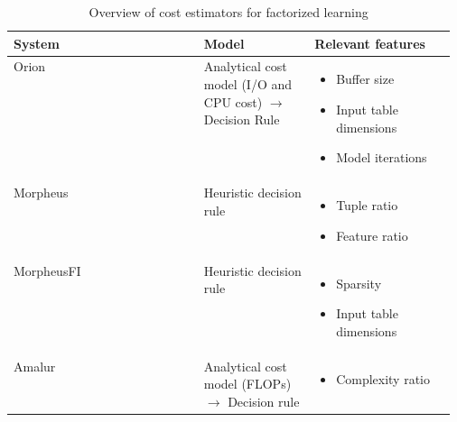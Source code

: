 \begin{table}[ht]
	\centering
	\begin{tabular}{lp{0.25\linewidth}p{0.32\linewidth}}
		\toprule
		System                                                       & Model                                                                & Relevant features                                                                                                                           \\ \midrule \midrule
		Orion      \cite{orion_learning_gen_lin_models}              & Analytical cost model (I/O and CPU cost) $\rightarrow$ Decision Rule & \begin{itemize}[noitemsep,topsep=0pt,leftmargin=0.3cm] \item Buffer size \item Input table dimensions \item Model iterations  \end{itemize} \\ \midrule
		Morpheus    \cite{morpheus}                                  & Heuristic decision rule                                              & \begin{itemize}[noitemsep,topsep=0pt,leftmargin=0.3cm] \item Tuple ratio \item Feature ratio  \end{itemize}                                 \\\midrule
		MorpheusFI  \cite{MorpheusFIEnablingOptimizingNonlinear2019} & Heuristic decision rule                                              & \begin{itemize}[noitemsep,topsep=0pt,leftmargin=0.3cm] \item Sparsity \item Input table dimensions \end{itemize}                            \\\midrule
		Amalur     \cite{schijndel_cost_estimation}                  & Analytical cost model (FLOPs) $\rightarrow$ Decision rule            & \begin{itemize}[noitemsep,topsep=0pt,leftmargin=00.3cm] \item Complexity ratio \end{itemize}                                                \\
		\bottomrule
	\end{tabular}
	\caption{Overview of cost estimators for factorized learning}
	\label{tab:cost_model_overview}
\end{table}

